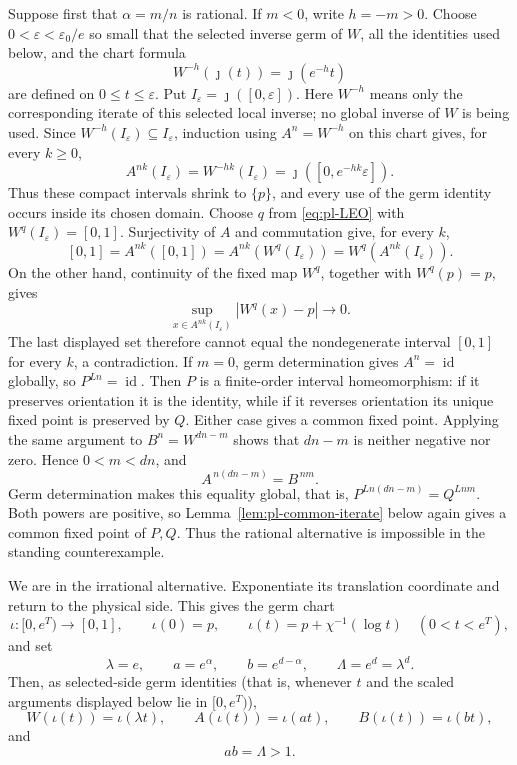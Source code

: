 \documentclass[11pt]{article}
\theoremstyle{definition}
\theoremstyle{remark}
\newcommand{\I}{[0,1]}
\newcommand{\id}{\operatorname{id}}
\begin{document}
Suppose first that \(\alpha=m/n\) is rational.  If \(m<0\), write
\(h=-m>0\).  Choose \(0<\varepsilon<\varepsilon_0/e\) so small that the
selected inverse germ of \(W\), all the identities used below, and the chart
formula
\[
 W^{-h}(\jmath(t))=\jmath(e^{-h}t)
\]
are defined on \(0\leq t\leq\varepsilon\).  Put
\(I_\varepsilon=\jmath([0,\varepsilon])\).  Here \(W^{-h}\) means only the
corresponding iterate of this selected local inverse; no global inverse of
\(W\) is being used.  Since \(W^{-h}(I_\varepsilon)\subseteq I_\varepsilon\),
induction using \(A^n=W^{-h}\) on this chart gives, for every \(k\geq0\),
\begin{equation}\label{eq:pl-rational-shrinking}
 A^{nk}(I_\varepsilon)
 =W^{-hk}(I_\varepsilon)
 =\jmath([0,e^{-hk}\varepsilon]).
\end{equation}
Thus these compact intervals shrink to \(\{p\}\), and every use of the germ
identity occurs inside its chosen domain.  Choose \(q\) from
\eqref{eq:pl-LEO} with \(W^q(I_\varepsilon)=\I\).  Surjectivity of \(A\) and
commutation give, for every \(k\),
\[
 \I=A^{nk}(\I)
    =A^{nk}(W^q(I_\varepsilon))
    =W^q(A^{nk}(I_\varepsilon)).
\]
On the other hand, continuity of the fixed map \(W^q\), together with
\(W^q(p)=p\), gives
\[
 \sup_{x\in A^{nk}(I_\varepsilon)}|W^q(x)-p|\longrightarrow0.
\]
The last displayed set therefore cannot equal the nondegenerate interval
\(\I\) for every \(k\), a contradiction.  If \(m=0\), germ determination
gives \(A^n=\id\)
globally, so \(P^{Ln}=\id\).  Then \(P\) is a finite-order interval
homeomorphism: if it preserves orientation it is the identity, while if it
reverses orientation its unique fixed point is preserved by \(Q\).  Either
case gives a common fixed point.  Applying the same argument to
\(B^n=W^{dn-m}\) shows that \(dn-m\) is neither negative nor zero.  Hence
\(0<m<dn\), and
\[
 A^{\,n(dn-m)}=B^{\,nm}.
\]
Germ determination makes this equality global, that is,
\(P^{Ln(dn-m)}=Q^{Lnm}\).  Both powers are positive, so
Lemma~\ref{lem:pl-common-iterate} below again gives a common fixed
point of \(P,Q\).  Thus the rational alternative is impossible in the
standing counterexample.

We are in the irrational alternative.  Exponentiate its translation
coordinate and return to the physical side.  This gives the germ chart
\[
 \iota:[0,e^T)\longrightarrow\I,\qquad
 \iota(0)=p,\qquad
 \iota(t)=p+\chi^{-1}(\log t)\quad(0<t<e^T),
\]
and set
\[
 \lambda=e,\qquad a=e^\alpha,\qquad b=e^{d-\alpha},\qquad
 \Lambda=e^d=\lambda^d.
\]
Then, as selected-side germ identities (that is, whenever \(t\) and the
scaled arguments displayed below lie in \([0,e^T)\)),
\begin{equation}\label{eq:actor-dilations}
 W(\iota(t))=\iota(\lambda t),\qquad
 A(\iota(t))=\iota(at),\qquad
 B(\iota(t))=\iota(bt),
\end{equation}
and
\begin{equation}\label{eq:pl-scale-product}
 ab=\Lambda>1.
\end{equation}
\end{document}
